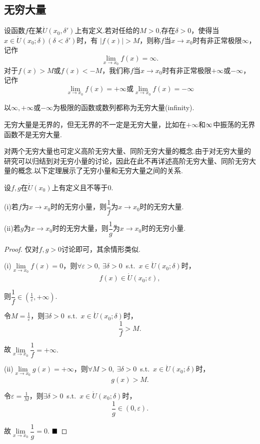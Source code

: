 \subsection{无穷大量}
\begin{definition}
	设函数$f$在某$\mathring{U}(x_0,\delta')$上有定义.若对任给的$M>0$,存在$\delta>0$，使得当$x\in\mathring{U}(x_0;\delta)(\delta<\delta')$时，有
	$|f(x)|>M$，则称$f$当$x\to x_0$时有{\heiti 非正常极限$\infty$}，记作
	$$\lim\limits_{x\to x_0}f(x)=\infty.$$
	对于$f(x)>M$或$f(x)<-M$，我们称$f$当$x\to x_0$时有非正常极限$+\infty$或$-\infty$，记作
	$$\lim\limits_{x\to x_0}f(x)=+\infty\text{或}\lim\limits_{x\to x_0}f(x)=-\infty$$
\end{definition}
\begin{definition}[无穷大量]
	以$\infty,+\infty$或$-\infty$为极限的函数或数列都称为{\heiti 无穷大量}(infinity).
\end{definition}
\begin{remark}
	无穷大量是无界的，但无无界的不一定是无穷大量，比如在$+\infty$和$\-\infty$中振荡的无界函数不是无穷大量.
\end{remark}
对两个无穷大量也可定义高阶无穷大量、同阶无穷大量的概念.由于对无穷大量的研究可以归结到对无穷小量的讨论，因此在此不再详述高阶无穷大量、同阶无穷大量的概念.以下定理展示了无穷小量和无穷大量之间的关系.
\begin{theorem}
	设$f,g$在$\mathring{U}(x_0)$上有定义且不等于$0$.
	
	(i)若$f$为$x\to x_0$时的无穷小量，则$\dfrac{1}{f}$为$x\to x_0$时的无穷大量.
	
	(ii)若$g$为$x\to x_0$时的无穷大量，则$\dfrac{1}{g}$为$x\to x_0$时的无穷小量.
\end{theorem}
\begin{proof}
	仅对$f,g>0$讨论即可，其余情形类似.
	
	(i)$\lim\limits_{x\to x_0}f(x)=0$，则$\forall\varepsilon>0,\ \exists\delta>0$\ s.t.\ $x\in \mathring{U}(x_0;\delta)$时，
	$$f(x)\in\mathring{U}(x_0;\varepsilon),$$
	
	则$\dfrac{1}{f}\in(\frac{1}{\varepsilon},+\infty)$.
	
	令$M=\frac{1}{\varepsilon}$，则$\exists\delta>0$\ s.t.\ $x\in \mathring{U}(x_0;\delta)$时，
	$$\frac{1}{f}>M.$$
	
	故$\lim\limits_{x\to x_0}\dfrac{1}{f}=+\infty.$
	
	(ii)$\lim\limits_{x\to x_0}g(x)=+\infty$，则$\forall M>0,\ \exists\delta>0$\ s.t.\ $x\in \mathring{U}(x_0;\delta)$时，
	$$g(x)>M.$$
	
	令$\varepsilon=\frac{1}{M}$，则$\exists\delta>0$\ s.t.\ $x\in \mathring{U}(x_0;\delta)$时，
	$$\frac{1}{g}\in (0,\varepsilon).$$
	
	故$\lim\limits_{x\to x_0}\dfrac{1}{g}=0.$
	$\hfill\blacksquare$
\end{proof}
